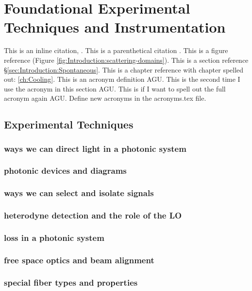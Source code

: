 \chapter{Foundational Experimental Techniques and Instrumentation}
\label{ch:Experimental}
\acresetall

This is an inline citation, \cite{boyd2020nonlinear}. This is a parenthetical citation \citep{boyd2020nonlinear}. This is a figure reference (Figure \ref{fig:Introduction:scattering-domains}). This is a section reference \S\ref{sec:Introduction:Spontaneous}. This is a chapter reference with chapter spelled out: \autoref{ch:Cooling}. This is an acronym definition \ac{AGU}. This is the second time I use the acronym in this section \ac{AGU}. This is if I want to spell out the full acronym again \acf{AGU}. Define new acronyms in the acronyms.tex file.


\section{Experimental Techniques}
\label{sec:Experimental:Experimental Techniques}
\lipsum[1]

  \subsection{ways we can direct light in a photonic system}
  \subsection{photonic devices and diagrams}
  \subsection{ways we can select and isolate signals}
  \subsection{heterodyne detection and the role of the LO}
  \subsection{loss in a photonic system}
  \subsection{free space optics and beam alignment}
  \subsection{special fiber types and properties}

